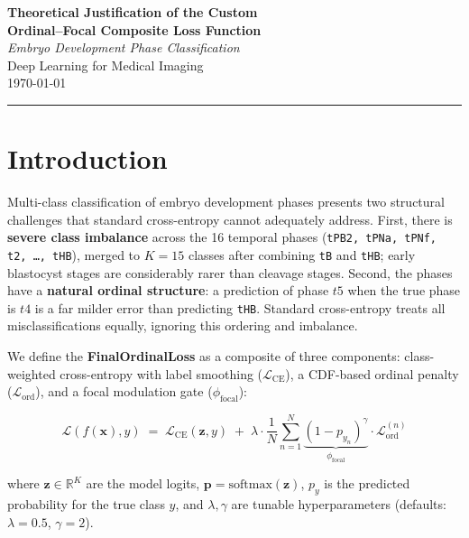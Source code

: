 \documentclass[12pt, a4paper]{article}
\theoremstyle{definition}
\theoremstyle{remark}
\begin{document}
\begin{center}
    {\LARGE \textbf{Theoretical Justification of the Custom}}\\[4pt]
    {\LARGE \textbf{Ordinal–Focal Composite Loss Function}}\\[12pt]
    {\large \textit{Embryo Development Phase Classification}}\\[6pt]
    {\normalsize Deep Learning for Medical Imaging}\\[4pt]
    {\small \today}
\end{center}
\vspace{1em}
\hrule
\vspace{1.5em}

\section{Introduction}

Multi-class classification of embryo development phases presents two structural
challenges that standard cross-entropy cannot adequately address. First, there is
\textbf{severe class imbalance} across the 16 temporal phases
(\texttt{tPB2, tPNa, tPNf, t2, \ldots, tHB}), merged to $K = 15$ classes after
combining \texttt{tB} and \texttt{tHB}; early blastocyst stages are considerably
rarer than cleavage stages. Second, the phases have a \textbf{natural ordinal
structure}: a prediction of phase $t5$ when the true phase is $t4$ is a far
milder error than predicting \texttt{tHB}. Standard cross-entropy treats all
misclassifications equally, ignoring this ordering and imbalance.

We define the \textbf{FinalOrdinalLoss} as a composite of three components:
class-weighted cross-entropy with label smoothing
($\mathcal{L}_{\mathrm{CE}}$), a CDF-based ordinal penalty
($\mathcal{L}_{\mathrm{ord}}$), and a focal modulation gate
($\phi_{\mathrm{focal}}$):

\begin{equation}
    \mathcal{L}(f(\mathbf{x}), y)
    \;=\;
    \mathcal{L}_{\mathrm{CE}}(\mathbf{z}, y)
    \;+\;
    \lambda \cdot \frac{1}{N}\sum_{n=1}^{N}
    \underbrace{(1 - p_{y_n})^{\gamma}}_{\phi_{\mathrm{focal}}} \cdot
    \mathcal{L}_{\mathrm{ord}}^{(n)}
    \label{eq:total}
\end{equation}

where $\mathbf{z} \in \mathbb{R}^{K}$ are the model logits, $\mathbf{p} =
\mathrm{softmax}(\mathbf{z})$, $p_{y}$ is the predicted probability for the
true class $y$, and $\lambda, \gamma$ are tunable hyperparameters (defaults:
$\lambda = 0.5$, $\gamma = 2$).
\end{document}

